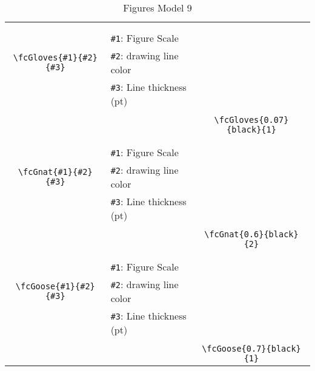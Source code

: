 \documentclass[x11names]{article}
\begin{document}
\begin{table}[H]
\begin{tabular}{|c|l|c|}
	&&\multirow{5}{*}{\fcGloves{0.07}{black}{1}}\\	&&\\	&\verb|#1|: Figure Scale &\\	\verb|\fcGloves{#1}{#2}{#3}|&	\verb|#2|: drawing line color &\\	&\verb|#3|: Line thickness (pt) &\\ &&\\&&	\verb|\fcGloves{0.07}{black}{1}|\\\hline 	
	&&\multirow{5}{*}{\fcGnat{0.6}{black}{2}}\\	&&\\	&\verb|#1|: Figure Scale &\\	\verb|\fcGnat{#1}{#2}{#3}|&	\verb|#2|: drawing line color &\\	&\verb|#3|: Line thickness (pt) &\\ &&\\&&	\verb|\fcGnat{0.6}{black}{2}|\\\hline 	
	&&\multirow{5}{*}{\fcGoose{0.7}{black}{1}}\\	&&\\	&\verb|#1|: Figure Scale &\\	\verb|\fcGoose{#1}{#2}{#3}|&	\verb|#2|: drawing line color &\\	&\verb|#3|: Line thickness (pt) &\\ &&\\&&	\verb|\fcGoose{0.7}{black}{1}|\\\hline 	\hline\end{tabular}\caption{Figures Model 9}\label{tab9}\end{table}
\end{document}
